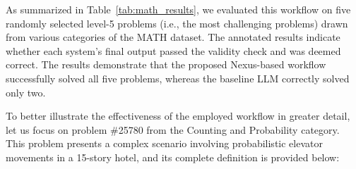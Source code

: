 \begin{table}[!h]
    \centering
    \vspace{8pt}
    \caption{Ablation study on the MATH dataset. Columns {\em Baseline} and {\em Nexus} report the assessment of the final answer, comparing it to the ground truth response for both Claude 3.5 v2 and our proposed architecture, respectively. Column {\em Observations} highlights the most significant aspect that emerged from each experiment.}
    \label{tab:math_results}
\end{table}

As summarized in Table~\ref{tab:math_results}, we evaluated this workflow on five randomly selected level-5 problems (i.e., the most challenging problems) drawn from various categories of the MATH dataset. The annotated results indicate whether each system's final output passed the validity check and was deemed correct. The results demonstrate that the proposed Nexus-based workflow successfully solved all five problems, whereas the baseline LLM correctly solved only two.

To better illustrate the effectiveness of the employed workflow in greater detail, let us focus on problem \#25780 from the Counting and Probability category. This problem presents a complex scenario involving probabilistic elevator movements in a 15-story hotel, and its complete definition is provided below:


